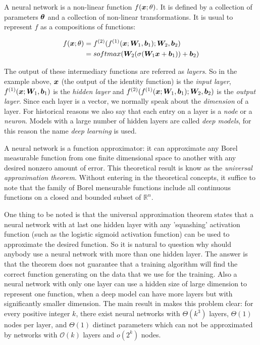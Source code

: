 A neural network is a non-linear function $f(\bm{x}; \theta)$. It is defined by a collection of parameters $\bm{\theta}$ and a collection of non-linear transformations. It is usual to represent $f$ as a compositions of functions:

\begin{align}
f(\bm{x}; \theta) &= f^{(2)}(f^{(1)}(\bm{x}; \bm{W}_1, \bm{b}_1); \bm{W}_2, \bm{b}_2)\\
&= softmax(\bm{W}_2 (\sigma(\bm{W}_1\bm{x} + \bm{b}_1)) + \bm{b}_2)
\end{align}


The output of these intermediary functions are referred as \textit{layers}. So in the example above, $\bm{x}$ (the output of the identity function) is the \textit{input layer}, $f^{(1)}(\bm{x}; \bm{W}_1, \bm{b}_1)$ is the \textit{hidden layer} and $f^{(2)}(f^{(1)}(\bm{x}; \bm{W}_1, \bm{b}_1); \bm{W}_2, \bm{b}_2)$ is the \textit{output layer}. Since each layer is a vector, we normally speak about the \textit{dimension} of a layer. For historical reasons we also say that each entry on a layer is a \textit{node} or a \textit{neuron}.  Models with a large number of hidden layers are called \textit{deep models}, for this reason the name \textit{deep learning} is used.  

\par A neural network is a function approximator: it can approximate any Borel measurable function from one finite dimensional space to another with any desired nonzero amount of error. This theoretical result is know as the \textit{universal approximation theorem}\cite{Cybenko}. Without entering in the theoretical concepts, it suffice to note that the family of Borel mensurable functions include all continuous functions on a closed and bounded subset of $\mathbb{R}^n$.


\par One thing to be noted is that the universal approximation theorem states that a neural network with at last one hidden layer with any 'squashing' activation function (such as the logistic sigmoid activation function) can be used to approximate the desired function. So it is natural to question why should anybody use a neural network with more than one hidden layer. The answer is that the theorem does not guarantee that a training algorithm will find the correct function generating on the data that we use for the training. Also a neural network with only one layer can use a hidden size of large dimension to represent one function, when a deep model can have more layers but with significantly smaller dimension. The main result in \cite{Telgarsky} makes this problem clear: for every positive integer $k$, there exist neural networks with $\Theta(k^3)$ layers, $\Theta(1)$ nodes per layer, and $\Theta(1)$ distinct parameters which can not be approximated by networks with $\mathcal{O}(k)$ layers and $o(2^k)$ nodes.  

